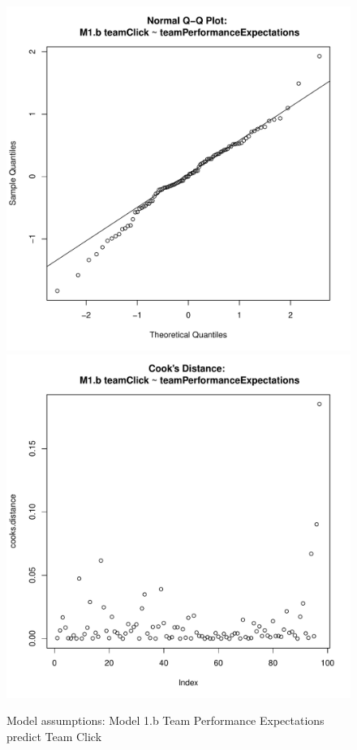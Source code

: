 {\begin{figure}[htbp]
   \includegraphics[scale =.4]{images/MLM1bQQNorm.pdf}
   \includegraphics[scale =.4]{images/MLM1bCooksD.pdf}
   \caption{Model assumptions: Model 1.b Team Performance Expectations predict Team Click}
   \label{fig:MLM1bAssumptions}
 \end{figure}



}
